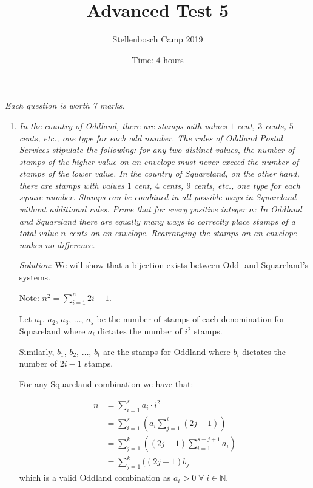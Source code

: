 \documentclass{article}
\title{Advanced Test 5}
\author{Stellenbosch Camp 2019}
\date{Time: $4$ hours}
\begin{document}
\maketitle
\thispagestyle{empty}

\hfill\textit{Each question is worth 7 marks.}

\vfill
\vfill


\begin{enumerate}[1.]

  \item %
  \textit{In the country of Oddland, there are stamps with values $1$ cent, $3$ cents, $5$ cents, etc., one type for each odd number.
  The rules of Oddland Postal Services stipulate the following: for any two distinct values, the number of stamps of the higher value on an envelope must never exceed the number of stamps of the lower value.
  In the country of Squareland, on the other hand, there are stamps with values $1$ cent, $4$ cents, $9$ cents, etc., one type for each square number.
  Stamps can be combined in all possible ways in Squareland without additional rules.
  Prove that for every positive integer $n$:
  In Oddland and Squareland there are equally many ways to correctly place stamps of a total value $n$ cents on an envelope.
  Rearranging the stamps on an envelope makes no difference.
  }
  
  \textit{Solution}: 
  We will show that a bijection exists between Odd- and Squareland's systems.
  
  Note: $n^2 = \sum_{i = 1}^{n}2i - 1$.
  
  Let $a_1$, $a_2$, $a_3$, $\dots$, $a_s$ be the number of stamps of each denomination for Squareland where $a_i$ dictates the number of $i^2$ stamps.
  
  Similarly, $b_1$, $b_2$, $\dots$, $b_t$ are the stamps for Oddland where $b_i$ dictates the number of $2i - 1$ stamps.
  
  For any Squareland combination we have that:
  
  \begin{align*}
    n &= \sum_ {i = 1}^{s} a_i \cdot i^2 \\
    &= \sum_ {i = 1}^{s} (a_i \sum_{j = 1}^{i} (2j - 1) ) \\
    &= \sum_ {j = 1}^{k} ((2j - 1) \sum_{i = 1}^{s - j + 1}a_i) \\
    &= \sum_ {j = 1}^{k} ((2j - 1) b_j 
  \end{align*}
  which is a valid Oddland combination as $a_i > 0 \;\forall\; i \in \mathbb{N}$.
  

\end{enumerate}
\end{document}
